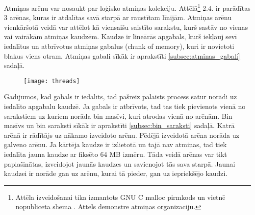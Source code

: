 Atmiņas arēnu var nosaukt par loģisko atmiņas kolekciju. Attēlā\footnote{Attēla izveidošanai tika izmantots GNU C malloc pirmkods \cite{MALLOC} un vietnē nopublicēta shēma \cite{AMM}. Attēls demonstrē atmiņas organizāciju.} 2.4. ir parādītas 3 arēnas, kuras ir atdalītas savā starpā ar raustītam līnijām.
 Atmiņas arēnu  vienkāršotā veidā var attēlot kā viensaišu saistīto sarakstu, kurš sastāv no vienas vai vairākām atmiņas kaudzēm. 
 Kaudze ir lineārās apgabals, kurš iekļauj sevī iedalītus un atbrīvotus atmiņas gabalus (chunk of memory), kuri ir novietoti blakus viens otram.
 Atmiņas gabali sīkāk ir aprakstīti \ref{subsec:atminas_gabali} sadaļā.
 \begin{figure}[h]
\begin{center}
\texttt{[image: threads]}
\end{center}
\caption{\textbf{\fontsize{11}{12}\selectfont {Atmiņas organizācija GNU C bibliotēkā (versija 2.3)}}}
\end{figure}
 Gadījumos, kad gabals ir iedalīts, tad pašreiz palaists process satur norādi uz iedalīto apgabalu kaudzē. 
 Ja gabals ir atbrīvots, tad tas tiek pievienots vienā no sarakstiem uz kuriem norāda bin masīvi, kuri atrodas vienā no arēnām.
Bin masīvs un bin saraksti sīkāk ir aprakstīti \ref{subsec:bin_saraksti} sadaļā. 
 Katrā arēnā ir rādītājs uz nākamo izveidoto arēnu. Pēdējā izveidotā arēna norāda uz galveno arēnu.
 Ja kārtēja kaudze ir izlietotā un tajā nav atmiņas, tad tiek iedalīta jauna kaudze ar fiksēto 64 MB izmēru.
  Tāda veidā arēnas var tikt paplašinātas, izveidojot jaunās kaudzes un savienojot tās sava starpā.
 Jaunai kaudzei ir norāde gan uz arēnu, kurai tā pieder, gan uz iepriekšējo kaudzi.

